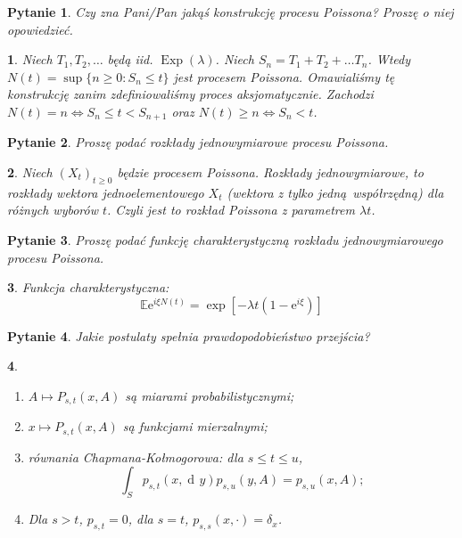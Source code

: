 \documentclass[10pt]{mwart}
\theoremstyle{plain}
\newtheorem{pytanie}{Pytanie}
\theoremstyle{break}
\newtheorem*{odpowiedź}{}
\newcommand*{\e}{\mathrm{e}}
\DeclareMathOperator{\diff}{d\!}
\begin{document}
\begin{pytanie}
Czy zna Pani/Pan jakąś konstrukcję procesu Poissona? Proszę o niej opowiedzieć.
\end{pytanie}
\begin{odpowiedź}
    Niech $T_1, T_2, \ldots$ będą iid. $\operatorname{Exp}(\lambda)$.
    Niech $S_n = T_1 + T_2 + \ldots T_n$.
    Wtedy $N(t) =\sup\{n \geq 0: S_n \leq t\}$ jest procesem Poissona.
    Omawialiśmy tę konstrukcję zanim zdefiniowaliśmy proces aksjomatycznie.
    Zachodzi $N(t) = n \iff S_n \leq t < S_{n+1}$ oraz $N(t) \geq n \iff S_n < t$.
\end{odpowiedź}


\begin{pytanie}
Proszę podać rozkłady jednowymiarowe procesu Poissona.
\end{pytanie}
\begin{odpowiedź}
    Niech $(X_t)_{t\geq 0}$ będzie procesem Poissona.
    Rozkłady jednowymiarowe, to rozkłady wektora jednoelementowego
    $X_t$ (wektora z tylko jedną współrzędną) dla różnych wyborów $t$.
    Czyli jest to rozkład Poissona z parametrem $\lambda t$.
\end{odpowiedź}


\begin{pytanie}
Proszę podać funkcję charakterystyczną rozkładu jednowymiarowego procesu Poissona.
\end{pytanie}
\begin{odpowiedź}
    Funkcja charakterystyczna: \[
    \mathbb{E}\e^{i\xi N(t)} = \exp[-\lambda t (1 - \e^{i\xi})]
    \]
\end{odpowiedź}


\begin{pytanie}
Jakie postulaty spełnia prawdopodobieństwo przejścia?
\end{pytanie}
\begin{odpowiedź}
\begin{enumerate}
    \item $A \mapsto P_{s,t} (x,A)$ są miarami probabilistycznymi;
    \item $x \mapsto P_{s,t}(x,A)$ są funkcjami mierzalnymi;
    \item równania Chapmana-Kołmogorowa: dla $s \leq t \leq u$, \[
    \int_S p_{s,t}(x, \diff y) p_{s, u}(y, A) = p_{s, u}(x, A);
    \] 
    \item Dla $s>t$, $p_{s, t} = 0$, dla $s = t$, $p_{s,s}(x, \cdot) = \delta_x$.
\end{enumerate}
\end{odpowiedź}
\end{document}
